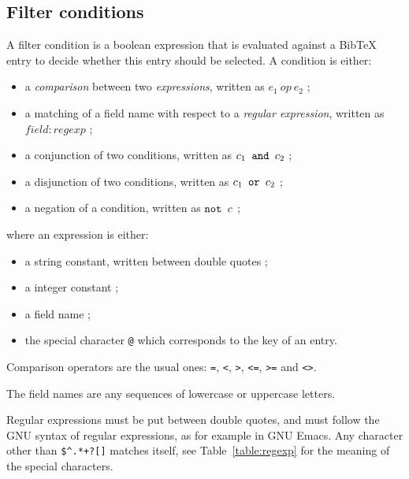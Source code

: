 \documentclass[11pt,a4paper]{article}
\begin{document}
\subsection{Filter conditions}

A filter condition is a boolean expression that is evaluated against a
BibTeX entry to decide whether this entry should be selected. A
condition is either:
\begin{itemize}
\item a \emph{comparison} between two \emph{expressions}, written as
  $e_1~op~e_2$ ; 
\item a matching of a field name with respect to a \emph{regular
    expression}, written as $field : regexp$ ; 
\item a conjunction of two conditions, written as $c_1 \verb| and |
  c_2$ ;
\item a disjunction of two conditions, written as $c_1 \verb| or |
  c_2$ ;
\item a negation of a condition, written as $\verb|not | c$ ;
\end{itemize}
where an expression is either:
\begin{itemize}
\item a string constant, written between double quotes ;
\item a integer constant ;
\item a field name ;
\item the special character \verb|@| which corresponds to the key of
  an entry.
\end{itemize} 

Comparison operators are the usual ones: \texttt{=}, \texttt{<},
\texttt{>}, \texttt{<=}, \texttt{>=} and \texttt{<>}. 

The field names are any sequences of lowercase or uppercase letters.

Regular expressions must be put between double quotes, and must follow
the GNU syntax of regular expressions, as for example in GNU
Emacs. Any character other than \verb|$^.*+?[]| matches itself, see
Table~\ref{table:regexp} for the meaning of the special characters. 
\end{document}
